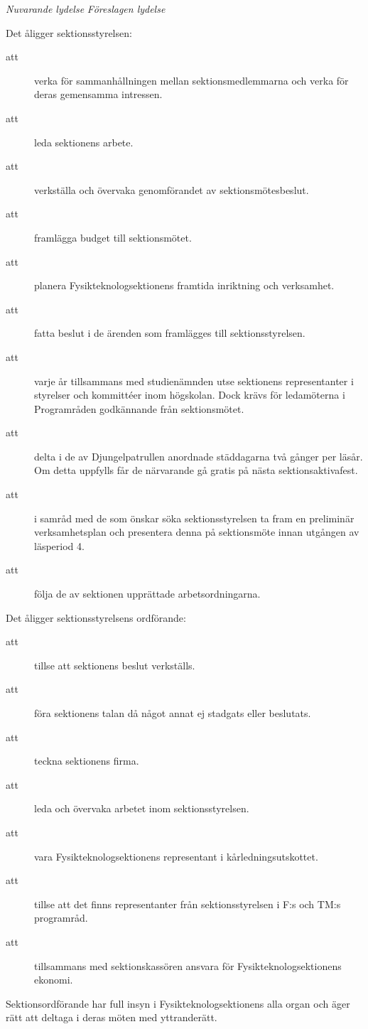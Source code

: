 \documentclass{article}
\newenvironment{lydelse}
    {\begin{paracol}{2}%
        \emph{Nuvarande lydelse}%
        \switchcolumn%
        \emph{Föreslagen lydelse}%
    \end{paracol}%
    \begin{enumerate}[label=\thesubsection.\arabic*]%
    \begin{paracol}{2}%
    }{\end{paracol}\end{enumerate}}
\begin{document}
\begin{lydelse}
    \setcounter{section}{4}
    \item Det åligger sektionsstyrelsen:
	\begin{description}
		\item[att] verka för sammanhållningen mellan sektionsmedlemmarna och verka för deras gemensamma intressen.
		\item[att] leda sektionens arbete.
		\item[att] verkställa och övervaka genomförandet av sektionsmötesbeslut.
		\item[att] framlägga budget till sektionsmötet.
		\item[att] planera Fysikteknologsektionens framtida inriktning och verksamhet.
		\item[att] fatta beslut i de ärenden som framlägges till sektionsstyrelsen.
		\item[att] varje år tillsammans med studienämnden utse sektionens representanter i styrelser och kommittéer inom högskolan. Dock krävs för ledamöterna i Programråden godkännande från sektionsmötet.
		\item[att] delta i de av Djungelpatrullen anordnade städdagarna två gånger per läsår. Om detta uppfylls får de närvarande gå gratis på nästa sektionsaktivafest.
		\item[att] i samråd med de som önskar söka sektionsstyrelsen ta fram en preliminär verksamhetsplan och presentera denna på sektionsmöte innan utgången av läsperiod 4.
		\item[att] följa de av sektionen upprättade arbetsordningarna.
	\end{description}

    \item Det åligger sektionsstyrelsens ordförande:
	\begin{description}
		\item[att] tillse att sektionens beslut verkställs.
		\item[att] föra sektionens talan då något annat ej stadgats eller beslutats.
		\item[att] teckna sektionens firma.
		\item[att] leda och övervaka arbetet inom sektionsstyrelsen.
		\item[att] vara Fysikteknologsektionens representant i kårledningsutskottet.
		\item[att] tillse att det finns representanter från sektionsstyrelsen i F:s och TM:s programråd.
		\item[att] tillsammans med sektionskassören ansvara för Fysikteknologsektionens ekonomi.
	\end{description}
    \noindent Sektionsordförande har full insyn i Fysikteknologsektionens alla organ och äger rätt att deltaga i deras möten med yttranderätt.


\end{lydelse}
\end{document}
